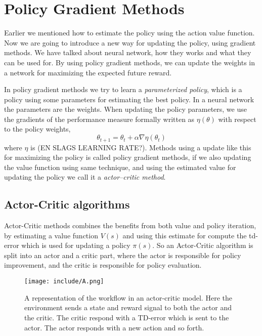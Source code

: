 \documentclass[11pt]{article}
\begin{document}
\section{Policy Gradient Methods}


Earlier we mentioned how to estimate the policy using the action value function. Now we are going to introduce a new way for updating the policy, using gradient methods. We have talked about neural network, how they works and what they can be used for. By using policy gradient methods, we can update the weights in a network for maximizing the expected future reward.

In policy gradient methods we try to learn a \textit{parameterized policy}, which is a policy using some parameters for estimating the best policy. In a neural network the parameters are the weights. When updating the policy parameters, we use the gradients of the performance measure formally written as $\eta(\theta)$ with respect to the policy weights,
\begin{equation}
    \theta_{t + 1} = \theta_{t} + \alpha \nabla \eta (\theta_{t})
\end{equation}
where $\eta$ is (EN SLAGS LEARNING RATE?). Methods using a update like this for maximizing the policy is called policy gradient methods, if we also updating the value function using same technique, and using the estimated value for updating the policy we call it a \textit{actor–critic method}.

\subsection{Actor-Critic algorithms}

Actor-Critic methods combines the benefits from both value and policy iteration, by estimating a value function $V(s)$ and using this estimate for compute the td-error which is used for updating a policy $\pi(s)$. So an Actor-Critic algorithm is split into an actor and a critic part, where the actor is responsible for policy improvement, and the critic is responsible for policy evaluation. 

\begin{figure}[!h]
    \centering
    \texttt{[image: include/A.png]}
    \caption{A representation of the workflow in an actor-critic
    model. Here the environment sends a state and reward signal to both the actor and the critic. The critic respond with a TD-error which is sent to the actor.
    The actor responds with a new action and so forth.}
    \label{fig:actor-critic}
\end{figure}
\end{document}
